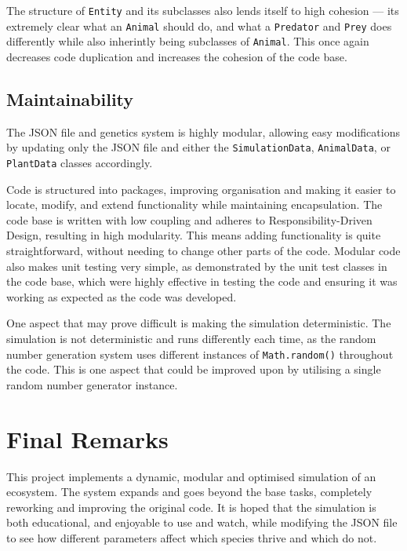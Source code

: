 \documentclass[10pt, a4paper]{scrartcl}
\begin{document}
\begin{multicols}{2}
        \noindent The structure of \verb|Entity| and its subclasses also lends itself to high cohesion — its extremely clear what an
        \verb|Animal| should do, and what a \verb|Predator| and \verb|Prey| does differently while also inherintly being subclasses of
        \verb|Animal|. This once again decreases code duplication and increases the cohesion of the code base.

        \noindent 

        \subsection{Maintainability}
        \noindent The JSON file and genetics system is highly modular, allowing easy modifications by updating only the JSON file and either the
        \verb|SimulationData|, \verb|AnimalData|, or \verb|PlantData| classes accordingly.

        \noindent Code is structured into packages, improving organisation and making it easier to locate, modify, and extend
        functionality while maintaining encapsulation. The code base is written with low coupling and adheres to Responsibility-Driven Design,
        resulting in high modularity. This means adding functionality is quite straightforward, without needing to change other parts 
        of the code. Modular code also makes unit testing very simple, as demonstrated by the unit test classes in the code base, which 
        were highly effective in testing the code and ensuring it was working as expected as the code was developed.

        \noindent One aspect that may prove difficult is making the simulation deterministic. The simulation is not deterministic
        and runs differently each time, as the random number generation system uses different instances of \verb|Math.random()| throughout
        the code. This is one aspect that could be improved upon by utilising a single random number generator instance.

        \section{Final Remarks}
        \noindent This project implements a dynamic, modular and optimised simulation of an ecosystem. The system expands and goes
        beyond the base tasks, completely reworking and improving the original code. It is hoped that the simulation is both
        educational, and enjoyable to use and watch, while modifying the JSON file to see how different parameters affect which 
        species thrive and which do not.

    \end{multicols}
\end{document}
